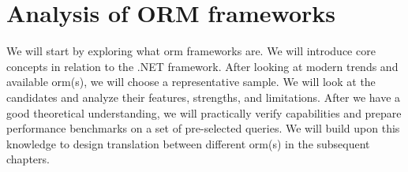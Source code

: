 \chapter{Analysis of ORM frameworks}
\label{chapter:ormcomparison}

We will start by exploring what \acrshort{orm} frameworks are. We will introduce core concepts in relation to the .NET framework. After looking at modern trends and available \acrshort{orm}(s), we will choose a representative sample. We will look at the candidates and analyze their features, strengths, and limitations. After we have a good theoretical understanding, we will practically verify capabilities and prepare performance benchmarks on a set of pre-selected queries. We will build upon this knowledge to design translation between different \acrshort{orm}(s) in the subsequent chapters.







